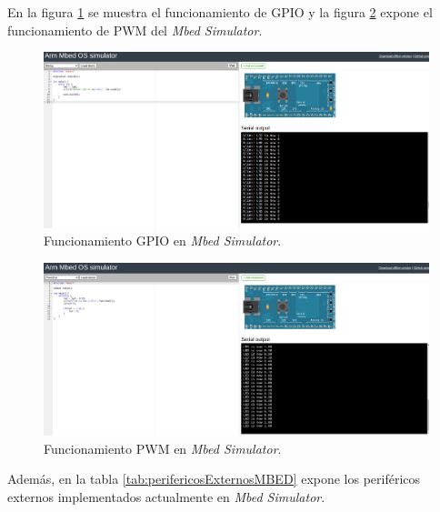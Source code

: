 \hfill \break
\hfill \break

En la figura \ref{fig:GPIOMbed} se muestra el funcionamiento de GPIO y la figura \ref{fig:PMWMbed} expone el funcionamiento de PWM del \textit{Mbed Simulator}.


\begin{figure}[ht]
	\centering
	\includegraphics[scale=.29]{./Figures/GPIOMbed.png}
	\caption{Funcionamiento GPIO en \textit{Mbed Simulator}.}
	\label{fig:GPIOMbed}
\end{figure}

\hfill \break
\hfill \break
\hfill \break
\hfill \break
\hfill \break
\hfill \break
\hfill \break
\hfill \break
\hfill \break
\hfill \break
\hfill \break
\hfill \break
\hfill \break
\hfill \break
\hfill \break
\hfill \break
\hfill \break
\hfill \break


\begin{figure}[ht]
	\centering
	\includegraphics[scale=.29]{./Figures/PMWMbed.png}
	\caption{Funcionamiento PWM en \textit{Mbed Simulator}.}
	\label{fig:PMWMbed}
\end{figure}





Además, en la tabla \ref{tab:perifericosExternosMBED} expone los  periféricos externos implementados actualmente en \textit{Mbed Simulator}.


